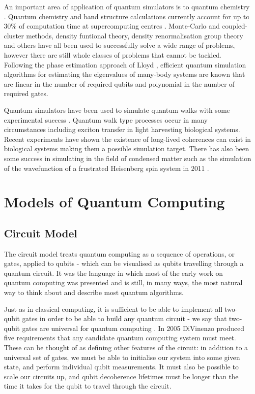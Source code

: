 An important area of application of quantum simulators is to quantum chemistry \cite{science_quantum_simulator_review_09}. Quantum chemistry and band structure calculations currently account for up to 30\% of computation time at supercomputing centres \cite{simulation_photon_review, supercomputer_report_10}. Monte-Carlo and coupled-cluster methods, density funtional theory, density renormalisation group theory and others have all been used to successfully solve a wide range of problems, however there are still whole classes of problems that cannot be tackled. Following the phase estimation approach of Lloyd \cite{lloyd_simulate_eigenvalues_99, lloyd_simulate_many_body_97}, efficient quantum simulation algorithms for estimating the eigenvalues of many-body systems are known \cite{quantum_chem_alg_05, simulation_hamiltonians_11} that are linear in the number of required qubits and polynomial in the number of required gates. 

Quantum simulators have been used to simulate quantum walks \cite{farhi_quantum_walks_98} with some experimental success \cite{quantum_walks_simulated_08}. Quantum walk type processes occur in many circumstances including exciton transfer in light harvesting biological systems. Recent experiments have shown the existence of long-lived coherences can exist in biological systems \cite{quant_bio_coherences_1, quant_bio_coherences_2, quant_bio_coherences_3} making them a possible simulation target. There has also been some success in simulating in the field of condensed matter such as the simulation of the wavefunction of a frustrated Heisenberg spin system in 2011 \cite{simulation_frustrated_spins_11}.

\section{Models of Quantum Computing}

\subsection{Circuit Model}

The circuit model treats quantum computing as a sequence of operations, or gates, applied to qubits - which can be visualised as qubits travelling through a quantum circuit. It was the language in which most of the early work on quantum computing was presented and is still, in many ways, the most natural way to think about and describe most quantum algorithms.

Just as in classical computing, it is sufficient to be able to implement all two-qubit gates in order to be able to build any quantum circuit - we say that two-qubit gates are universal for quantum computing \cite{two_bit_gates_universal}. In 2005 DiVinenzo produced five requirements \cite{divincenzo_requirements} that any candidate quantum computing system must meet. These can be thought of as defining other features of the circuit: in addition to a universal set of gates, we must be able to initialise our system into some given state, and perform individual qubit measurements. It must also be possible to scale our circuits up, and qubit decoherence lifetimes must be longer than the time it takes for the qubit to travel through the circuit.

